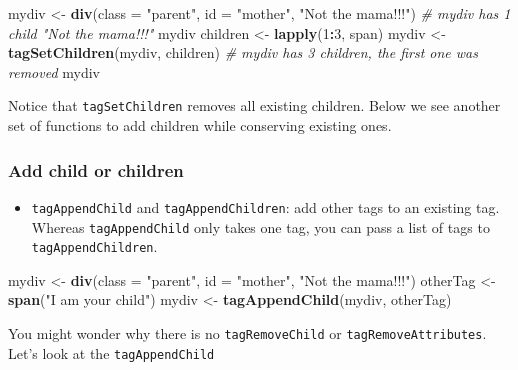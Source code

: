 \documentclass[]{book}
\newenvironment{Shaded}{\begin{snugshade}}{\end{snugshade}}
\newcommand{\CommentTok}[1]{\textcolor[rgb]{0.56,0.35,0.01}{\textit{#1}}}
\newcommand{\DataTypeTok}[1]{\textcolor[rgb]{0.13,0.29,0.53}{#1}}
\newcommand{\DecValTok}[1]{\textcolor[rgb]{0.00,0.00,0.81}{#1}}
\newcommand{\KeywordTok}[1]{\textcolor[rgb]{0.13,0.29,0.53}{\textbf{#1}}}
\newcommand{\NormalTok}[1]{#1}
\newcommand{\OperatorTok}[1]{\textcolor[rgb]{0.81,0.36,0.00}{\textbf{#1}}}
\newcommand{\StringTok}[1]{\textcolor[rgb]{0.31,0.60,0.02}{#1}}
\providecommand{\tightlist}{%
  \setlength{\itemsep}{0pt}\setlength{\parskip}{0pt}}
\begin{document}
\begin{Shaded}
\begin{Highlighting}[]
\NormalTok{mydiv <-}\StringTok{ }\KeywordTok{div}\NormalTok{(}\DataTypeTok{class =} \StringTok{"parent"}\NormalTok{, }\DataTypeTok{id =} \StringTok{"mother"}\NormalTok{, }\StringTok{"Not the mama!!!"}\NormalTok{)}
\CommentTok{# mydiv has 1 child "Not the mama!!!"}
\NormalTok{mydiv }
\NormalTok{children <-}\StringTok{ }\KeywordTok{lapply}\NormalTok{(}\DecValTok{1}\OperatorTok{:}\DecValTok{3}\NormalTok{, span)}
\NormalTok{mydiv <-}\StringTok{ }\KeywordTok{tagSetChildren}\NormalTok{(mydiv, children)}
\CommentTok{# mydiv has 3 children, the first one was removed}
\NormalTok{mydiv }
\end{Highlighting}
\end{Shaded}

Notice that \texttt{tagSetChildren} removes all existing children. Below we see another set of functions to add children while conserving existing ones.

\hypertarget{add-child-or-children}{%
\subsubsection{Add child or children}\label{add-child-or-children}}

\begin{itemize}
\tightlist
\item
  \texttt{tagAppendChild} and \texttt{tagAppendChildren}: add other tags to an existing tag.
  Whereas \texttt{tagAppendChild} only takes one tag, you can pass a list of tags to \texttt{tagAppendChildren}.
\end{itemize}

\begin{Shaded}
\begin{Highlighting}[]
\NormalTok{mydiv <-}\StringTok{ }\KeywordTok{div}\NormalTok{(}\DataTypeTok{class =} \StringTok{"parent"}\NormalTok{, }\DataTypeTok{id =} \StringTok{"mother"}\NormalTok{, }\StringTok{"Not the mama!!!"}\NormalTok{)}
\NormalTok{otherTag <-}\StringTok{ }\KeywordTok{span}\NormalTok{(}\StringTok{"I am your child"}\NormalTok{)}
\NormalTok{mydiv <-}\StringTok{ }\KeywordTok{tagAppendChild}\NormalTok{(mydiv, otherTag)}
\end{Highlighting}
\end{Shaded}

You might wonder why there is no \texttt{tagRemoveChild} or \texttt{tagRemoveAttributes}.
Let's look at the \texttt{tagAppendChild}
\end{document}
